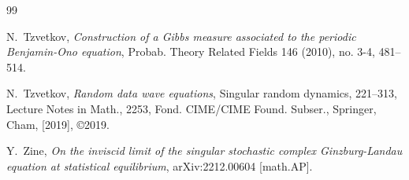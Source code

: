 \documentclass[%
11pt,  reqno]{amsart}
\newcommand{\1}{\hspace{0.2mm}\text{I}\hspace{0.2mm}}
\numberwithin{equation}{section}
\numberwithin{theorem}{section}
\begin{document}
\begin{thebibliography}{99}



N.~Tzvetkov, 
{\it Construction of a Gibbs measure associated to the periodic Benjamin-Ono equation},
Probab. Theory Related Fields 146 (2010), no. 3-4, 481--514.


N.~Tzvetkov, 
{\it Random data wave equations},
 Singular random dynamics, 221--313, Lecture Notes in Math., 2253, Fond. CIME/CIME Found. Subser., Springer, Cham, [2019], \copyright2019. 





Y.~Zine,
{\it 
On the inviscid limit of the singular stochastic complex Ginzburg-Landau equation at statistical equilibrium}, 
arXiv:2212.00604 [math.AP].

\end{thebibliography}
\end{document}
